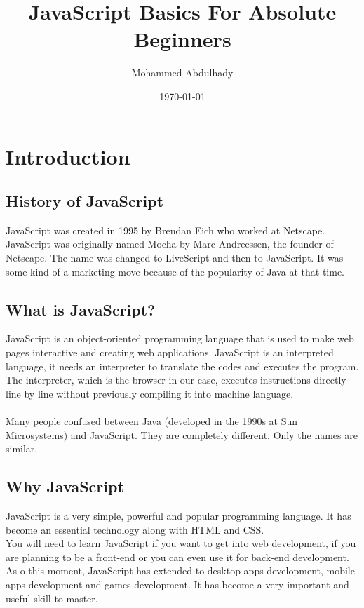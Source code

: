 \documentclass {book}
\begin{document}
	\title{JavaScript Basics For Absolute Beginners}
	\author{Mohammed Abdulhady}
	\date{\today}
	\maketitle	
	\tableofcontents
	\chapter{Introduction}
	\section{History of JavaScript}
	JavaScript was created in 1995 by Brendan Eich who worked at Netscape. JavaScript was originally named Mocha by Marc Andreessen, the founder of Netscape. The name was changed to LiveScript and then to JavaScript. It was some kind of a marketing move because of the popularity of Java at that time.
	\section{What is JavaScript?}
	JavaScript is an object-oriented programming language that is used to make web pages interactive and creating web applications. JavaScript is an interpreted language, it needs an interpreter to translate the codes and executes the program. The interpreter, which is the browser in our case, executes instructions directly line by line without previously compiling it into machine language.\\\\
	Many people confused between Java (developed in the 1990s at Sun Microsystems) and JavaScript. They are completely different. Only the names are similar.
	\section{Why JavaScript}
	JavaScript is a very simple, powerful and popular programming language. It has become an essential technology along with HTML and CSS.\\
	You will need to learn JavaScript if you want to get into web development, if you are planning to be a front-end or you can even use it for back-end development.\\
	As o this moment, JavaScript has extended to desktop apps development, mobile apps development and games development.
	It has become a very important and useful skill to master.
\end{document}
